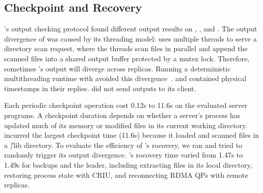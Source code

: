 




\subsection{Checkpoint and Recovery} \label{sec:robust}

\xxx's output checking protocol found different output results on \clamav, 
\openldap, and \mediatomb. The output divergence of \clamav was caused by its 
threading model: \clamav uses multiple threads to serve a directory scan 
request, where the threads scan files in parallel and append the scanned files 
into a shared output buffer protected by a mutex lock. Therefore, sometimes 
\clamav's output will diverge across replicas. Running a deterministic 
multithreading runtime with \clamav avoided this divergence~\cite{crane:sosp15}. 
\openldap and \mediatomb contained physical timestamps in their replies. 
\calvin did not send outputs to its client.


Each \xxx periodic checkpoint operation cost 0.12s to 11.6s on the 
evaluated server programs. A checkpoint duration depends on whether a 
server's process has updated much of its memory or modified files in its 
current working directory. \clamav incurred the largest checkpoint time (11.6s) 
because it loaded and scanned files in a \v{/lib} directory. To evaluate the 
efficiency of \xxx's rocovery, we ran \clamav and tried to randomly trigger its 
output divergence. \clamav's rocovery time varied from 1.47s to 1.49s for 
backups and the leader, including extracting files in its local directory, 
restoring process state with CRIU, and reconnecting RDMA QPs with remote 
replicas.








